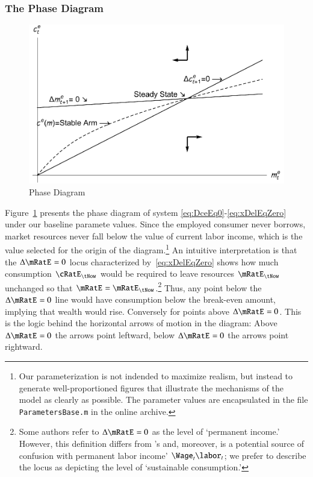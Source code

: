 \documentclass[titlepage,abstract]{\econtex}\newcommand{\texname}{ctDiscrete}
\begin{document}
\subsubsection{The Phase Diagram \label{sec:phase} }
\begin{figure}
\caption{Phase Diagram}\label{fig:PhaseDiag}
\includegraphics{./Figures/TractableBufferStockPhaseDiag}
\end{figure}
Figure~\ref{fig:PhaseDiag} presents the phase diagram of system
\eqref{eq:DceEq0}-\eqref{eq:xDelEqZero} under our baseline paramete
values. Since the employed consumer never borrows, market resources never fall below the value of current labor income, which is the value selected for the origin of the diagram.\footnote{Our parameterization is not indended to maximize
  realism, but instead to generate well-proportioned figures that
  illustrate the mechanisms of the model as clearly as possible.  The
  parameter values are encapsulated in the file
  \texttt{ParametersBase.m} in the online archive.} 
An intuitive interpretation is that the $\Delta \mRatE_{\tSS} = 0$ locus
characterized by~\eqref{eq:xDelEqZero} shows how much consumption
$\cRatE_{\tNow}$ would be required to leave resources $\mRatE_{\tNow}$
unchanged so that $\mRatE_{\tSS}=\mRatE_{\tNow}$.\footnote{Some
  authors refer to $\Delta \mRatE_{\tSS} = 0$ as the level of
  `permanent income.' However, this definition differs from
  \cite{friedmanATheory}'s and, moreover, is a potential source of
  confusion with permanent labor income' $\Wage_{t} \labor_{t}$; we
  prefer to describe the locus as depicting the level of `sustainable
  consumption.'} 
Thus, any point below the $\Delta \mRatE_{\tSS}=0$
line would have consumption below the break-even amount, implying that
wealth would rise. Conversely for points above $\Delta
\mRatE_{\tSS}=0$. This is the logic behind the horizontal arrows of
motion in the diagram: Above $\Delta \mRatE_{\tSS}=0$ the arrows point
leftward, below $\Delta \mRatE_{\tSS}=0$ the arrows point rightward.
\end{document}
